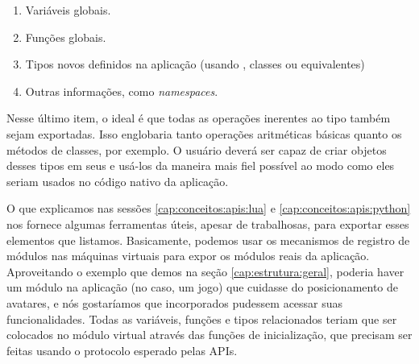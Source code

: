     \begin{enumerate}
      \item Variáveis globais.
      \item Funções globais.
      \item Tipos novos definidos na aplicação (usando , classes
            ou equivalentes)
      \item Outras informações, como \textit{namespaces}.
    \end{enumerate}

    Nesse último item, o ideal é que todas as operações inerentes ao tipo
    também sejam exportadas. Isso englobaria tanto operações aritméticas básicas
    quanto os métodos de classes, por exemplo. O usuário deverá ser capaz de
    criar objetos desses tipos em seus  e usá-los da maneira mais fiel
    possível ao modo como eles seriam usados no código nativo da aplicação.

    O que explicamos nas sessões \ref{cap:conceitos:apis:lua} e
    \ref{cap:conceitos:apis:python} nos fornece algumas ferramentas úteis,
    apesar de trabalhosas, para exportar esses elementos que listamos.
    Basicamente, podemos usar os mecanismos de registro de módulos nas máquinas
    virtuais para expor os módulos reais da aplicação\footnotemark{}. Aproveitando
    o exemplo que demos na seção \ref{cap:estrutura:geral}, poderia haver um
    módulo na aplicação (no caso, um jogo) que cuidasse do posicionamento de
    avatares, e nós gostaríamos que  incorporados pudessem acessar
    suas funcionalidades. Todas as variáveis, funções e tipos relacionados
    teriam que ser colocados no módulo virtual através das funções de
    inicialização, que precisam ser feitas usando o protocolo esperado pelas
    APIs.


